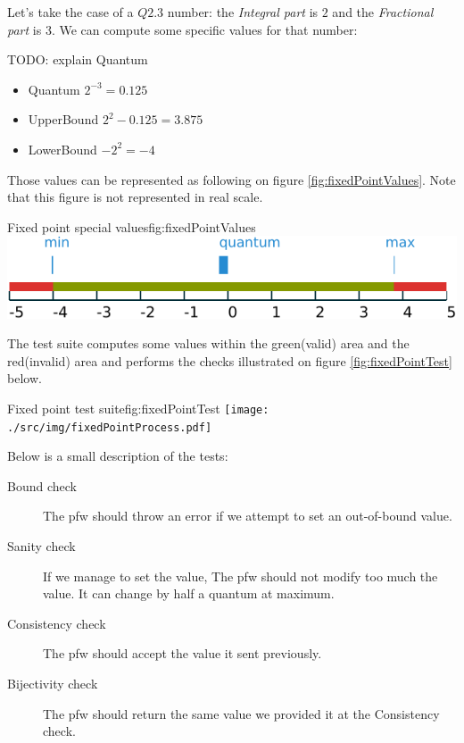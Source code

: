 Let's take the case of a $Q2.3$ number: the \emph{Integral part} is $2$ and the
\emph{Fractional part} is $3$. We can compute some specific values for that number:

TODO: explain Quantum
\begin{itemize}
    \item Quantum $2^{-3} = 0.125$
    \item UpperBound $2^2 - 0.125 = 3.875$
    \item LowerBound $-2^2 = -4$
\end{itemize}

Those values can be represented as following on figure \ref{fig:fixedPointValues}. Note that
this figure is not represented in real scale.
\begin{figureGraphics}{Fixed point special values}{fig:fixedPointValues}
    \includegraphics[width=\textwidth]{./src/img/fixedPoint.pdf}
\end{figureGraphics}

The test suite computes some values within the green(valid) area and the
red(invalid) area and performs the checks illustrated on figure \ref{fig:fixedPointTest} below.

\begin{figureGraphics}{Fixed point test suite}{fig:fixedPointTest}
    \texttt{[image: ./src/img/fixedPointProcess.pdf]}
\end{figureGraphics}

Below is a small description of the tests:
\begin{description}
    \item[Bound check] The \gls{pfw} should throw an error if we
        attempt to set an out-of-bound value.
    \item[Sanity check] If we manage to set the value, The \gls{pfw} should not modify too much
        the value. It can change by half a quantum at maximum.
    \item[Consistency check] The \gls{pfw} should accept the value it sent previously.
    \item[Bijectivity check] The \gls{pfw} should return the same value we provided it at the Consistency check.
\end{description}

